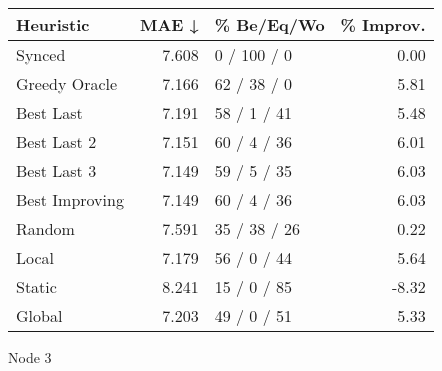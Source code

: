 \begin{tabular}{lrlr}
\toprule
\textbf{Heuristic} & \textbf{MAE ↓} & \textbf{\% Be/Eq/Wo} & \textbf{\% Improv.} \\
\midrule
            Synced &          7.608 &          0 / 100 / 0 &                0.00 \\
     Greedy Oracle &          7.166 &          62 / 38 / 0 &                5.81 \\
         Best Last &          7.191 &          58 / 1 / 41 &                5.48 \\
       Best Last 2 &          7.151 &          60 / 4 / 36 &                6.01 \\
       Best Last 3 &          7.149 &          59 / 5 / 35 &                6.03 \\
    Best Improving &          7.149 &          60 / 4 / 36 &                6.03 \\
            Random &          7.591 &         35 / 38 / 26 &                0.22 \\
             Local &          7.179 &          56 / 0 / 44 &                5.64 \\
            Static &          8.241 &          15 / 0 / 85 &               -8.32 \\
            Global &          7.203 &          49 / 0 / 51 &                5.33 \\
\bottomrule
\end{tabular}
\caption{Node 3}
\label{tab:ds_non_lr01_le2_bs2_3}
